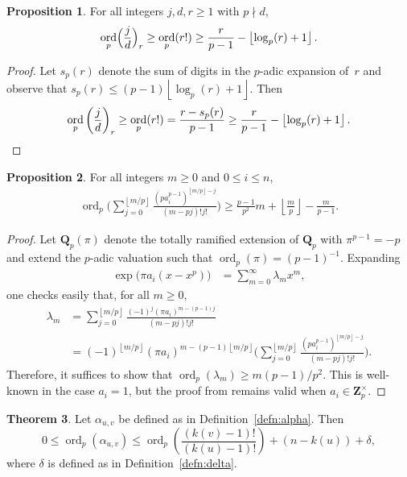 \documentclass[a4paper,11pt]{article}
\numberwithin{equation}{section}
\providecommand{\floor}[1]{\left\lfloor#1\right\rfloor}   %
\newcommand{\ZZ}{\mathbf{Z}} %
\newcommand{\QQ}{\mathbf{Q}} %
\DeclareMathOperator{\ord}{ord}          %
\theoremstyle{definition}
\newtheorem{thm}{Theorem}[section]
\newtheorem{prop}[thm]{Proposition}
\begin{document}
\begin{prop} \label{prop:rfac}
For all integers $j, d, r \geq 1$ with $p \nmid d$, 
\begin{equation*}
\ord_p\Bigl(\frac{j}{d}\Bigr)_r \geq \ord_p(r!) \geq \frac{r}{p-1} - \floor{\log_p(r) + 1}.
\end{equation*}
\end{prop}

\begin{proof}
Let $s_p(r)$ denote the sum of digits in the $p$-adic expansion of~$r$ 
and observe that $s_p(r) \leq (p-1)\floor{\log_p(r) + 1}$. Then 
\begin{equation*}
\ord_p\left(\frac{j}{d}\right)_r \geq \ord_p(r!) 
    = \frac{r - s_p(r)}{p-1} \geq \frac{r}{p-1} - \floor{\log_p(r) + 1}. \qedhere
\end{equation*}
\end{proof}

\begin{prop} \label{prop:coefbound}
For all integers $m \geq 0$ and $0 \leq i \leq n$,
\begin{align*}
\ord_p \biggl( \sum_{j=0}^{\floor{m/p}} \frac{(p a_i^{p-1})^{\floor{m/p}-j}}{(m-pj)!j!} \biggr) 
    \geq \frac{p-1}{p^2}m + \floor{\frac{m}{p}}-\frac{m}{p-1}.
\end{align*}
\end{prop}
\begin{proof}
Let $\QQ_p(\pi)$ denote the totally ramified extension of $\QQ_p$ with $\pi^{p-1} = -p$ and 
extend the $p$-adic valuation such that \mbox{$\ord_p(\pi) = (p-1)^{-1}$}. Expanding
\begin{align*}
\exp \bigl( \pi a_i(x-x^p) \bigr) &= \sum_{m=0}^{\infty} \lambda_m x^m,
\end{align*}
one checks easily that, for all $m \geq 0$,
\begin{align*}
\lambda_m &= \sum_{j=0}^{\floor{m/p}} \frac{(-1)^j (\pi a_i)^{m-(p-1)j}}{(m-pj)!j!} \\
          &= (-1)^{\floor{m/p}} (\pi a_i)^{m-(p-1)\floor{m/p}} \biggl( \sum_{j=0}^{\floor{m/p}} \frac{(p a_i^{p-1})^{\floor{m/p}-j}}{(m-pj)!j!} \biggr).
\end{align*}
Therefore, it suffices to show that $\ord_p(\lambda_m) \geq m (p-1)/p^2$. This is 
well-known in the case $a_i=1$, but the proof from \citep[Lemma 4.1]{dwork1962} 
remains valid when $a_i \in \ZZ_p^{\times}$. 
\end{proof}

\begin{thm} \label{thm:alphabound} 
Let $\alpha_{u,v}$ be defined as in Definition~\ref{defn:alpha}. Then
\begin{equation*}
0 \leq \ord_p(\alpha_{u,v}) \leq \ord_p\left( \frac{(k(v)-1)!}{(k(u)-1)!} \right)+(n-k(u))+\delta,
\end{equation*}
where $\delta$ is defined as in Definition~\ref{defn:delta}. 
\end{thm}
\end{document}
